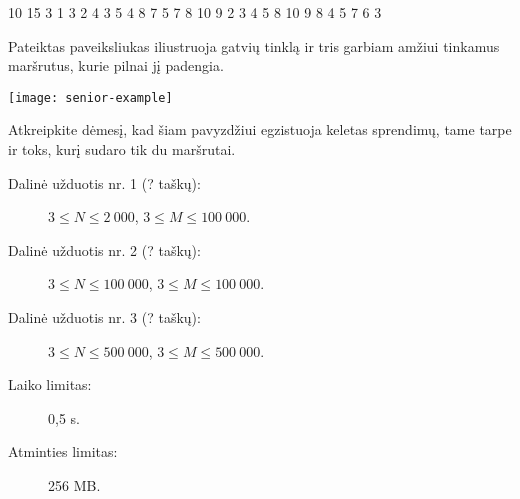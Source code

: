 \documentclass{boi2014-lt}
\begin{document}
    \example
    {
        10 15  3  1 3  2 4  3 5  4 8  7  5 7  8  10  9
    }
    {
        2 3 4 5 8 10 9  8 4 5 7 6 3
    }
    {
        Pateiktas paveiksliukas iliustruoja gatvių tinklą ir tris garbiam amžiui
        tinkamus maršrutus, kurie pilnai jį padengia.

        \texttt{[image: senior-example]}

        Atkreipkite dėmesį, kad šiam pavyzdžiui egzistuoja keletas sprendimų,
        tame tarpe ir toks, kurį sudaro tik du maršrutai.
    }

    \Scoring

    \begin{description}
        \item[Dalinė užduotis nr. 1 (? taškų):]
            $3 \le N \le 2\ 000$, $3 \le M \le 100\ 000$.
        \item[Dalinė užduotis nr. 2 (? taškų):]
            $3 \le N \le 100\ 000$, $3 \le M \le 100\ 000$.
        \item[Dalinė užduotis nr. 3 (? taškų):]
            $3 \le N \le 500\ 000$, $3 \le M \le 500\ 000$.
    \end{description}

    \Constraints

    \begin{description}
        \item[Laiko limitas:] 0,5 s.
        \item[Atminties limitas:] 256 MB.
    \end{description}
\end{document}
